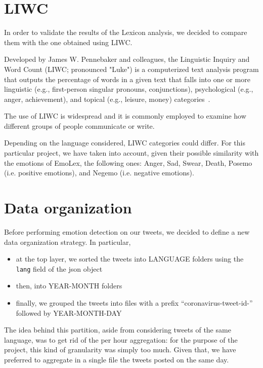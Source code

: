 \section{LIWC}
\label{sec:liwc}

In order to validate the results of the Lexicon analysis, we decided to compare them with the one obtained using LIWC.

Developed by James W. Pennebaker and colleagues, the Linguistic Inquiry and Word Count (LIWC; pronounced "Luke") is a computerized text analysis program that outputs the percentage of words in a given text that falls into one or more linguistic (e.g., first-person singular pronouns, conjunctions), psychological (e.g., anger, achievement), and topical (e.g., leisure, money) categories~\cite{enwiki:1023542720}.

The use of LIWC is widespread and it is commonly employed to examine how different groups of people communicate or write.

Depending on the language considered, LIWC categories could differ. For this particular project, we have taken into account, given their possible similarity with the emotions of EmoLex, the following ones: Anger, Sad, Swear, Death, Posemo (i.e. positive emotions), and Negemo (i.e. negative emotions).

\section{Data organization}
\label{sub:data-org}

Before performing emotion detection on our tweets, we decided to define a new data organization strategy. In particular,

\begin{itemize}
	\item at the top layer, we sorted the tweets into LANGUAGE folders using the \texttt{lang} field of the json object
	\item then, into YEAR-MONTH folders
	\item finally, we grouped the tweets into files with a prefix “coronavirus-tweet-id-” followed by YEAR-MONTH-DAY
\end{itemize}

The idea behind this partition, aside from considering tweets of the same language, was to get rid of the per hour aggregation: for the purpose of the project, this kind of granularity was simply too much. Given that, we have preferred to aggregate in a single file the tweets posted on the same day.

